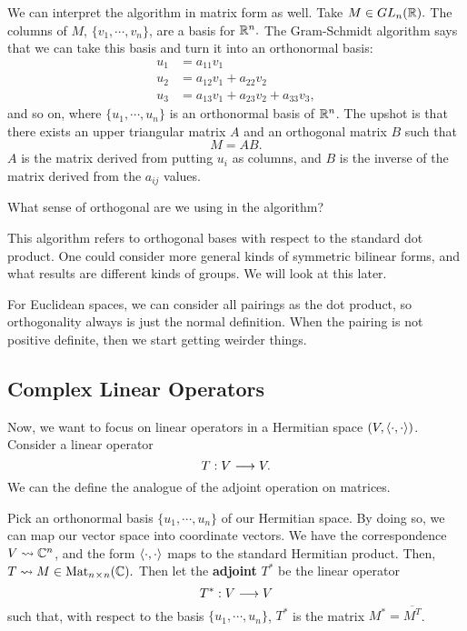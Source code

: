 We can interpret the algorithm in matrix form as well. 
Take $M \in GL_n(\mathbb R).$ The columns of $M$, $\{v_1, \cdots, v_n\}$, are a basis for $\mathbb R^n.$ 
The Gram-Schmidt algorithm says that we can take this basis and turn it into an orthonormal basis:
\begin{align*}
    u_1 &= a_{11}v_1 \\
    u_2 &= a_{12}v_1 + a_{22}v_2 \\
    u_3 &= a_{13}v_1 + a_{23}v_2 + a_{33}v_3,
\end{align*}
and so on, where $\{u_1, \cdots, u_n\}$ is an orthonormal basis of $\mathbb R^n$.
The upshot is that there exists an upper triangular matrix $A$ and an orthogonal matrix $B$ such that \[M = AB.\] $A$ is the matrix derived from putting $u_i$ as columns, and $B$ is the inverse of the matrix derived from the $a_{ij}$ values.  
\begin{question}
    What sense of orthogonal are we using in the algorithm?
\end{question}
\begin{ans}
    This algorithm refers to orthogonal bases with respect to the standard dot product. 
    One could consider more general kinds of symmetric bilinear forms, and what results are different kinds of groups. 
    We will look at this later. 
    
    For Euclidean spaces, we can consider all pairings as the dot product, so orthogonality always is just the normal definition.
    When the pairing is not positive definite, then we start getting weirder things.
\end{ans}
\subsection{Complex Linear Operators}
Now, we want to focus on linear operators in a Hermitian space $(V, \langle \cdot, \cdot \rangle)$. Consider a linear operator 
\[
T: V \longrightarrow V.
\]
We can the define the analogue of the adjoint operation on matrices.
\begin{definition}
Pick an orthonormal basis $\{u_1, \cdots, u_n\}$ of our Hermitian space. By doing so, we can map our vector space into coordinate vectors. We have the correspondence $V \rightsquigarrow \mathbb C^n$, and the form $\langle \cdot, \cdot \rangle$ maps to the standard Hermitian product. Then, $T \rightsquigarrow M \in \text{Mat}_{n \hspace{0.05em}{\times}\hspace{0.05em} n}(\mathbb C).$ Then let the \textbf{adjoint} $T^*$ be the linear operator
\[
T^*: V \longrightarrow V
\]
such that, with respect to the basis $\{u_1, \cdots, u_n \}$, $T^*$ is the matrix $M^* = \overline{M^T}$. 
\end{definition}

